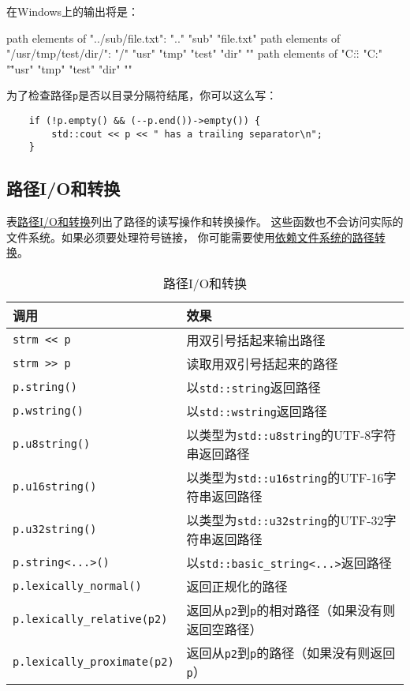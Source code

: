 在Windows上的输出将是：
\begin{blacklisting}
    path elements of "../sub/file.txt":
    ".."  "sub"  "file.txt"
    path elements of "/usr/tmp/test/dir/":
    "/"  "usr"  "tmp"  "test"  "dir"  ""
    path elements of "C:\usr\tmp\test\dir\":
    "C:"  "\"  "usr"  "tmp"  "test"  "dir"  ""
\end{blacklisting}
为了检查路径\texttt{p}是否以目录分隔符结尾，你可以这么写：
\begin{lstlisting}
    if (!p.empty() && (--p.end())->empty()) {
        std::cout << p << " has a trailing separator\n";
    }
\end{lstlisting}

\subsection{路径I/O和转换}\label{ch20.3.3}
表\hyperref[t20.5]{路径I/O和转换}列出了路径的读写操作和转换操作。
这些函数也不会访问实际的文件系统。如果必须要处理符号链接，
你可能需要使用\hyperref[ch20.4.5]{依赖文件系统的路径转换}。
\begin{table}[htb]
    \centering
    \begin{tabular}{l|l}
        \hline
        \textbf{调用}                         & \textbf{效果}                                     \\
        \hline
        \texttt{strm << p}                  & 用双引号括起来输出路径                                     \\
        \texttt{strm >> p}                  & 读取用双引号括起来的路径                                    \\
        \texttt{p.string()}                 & 以\texttt{std::string}返回路径                       \\
        \texttt{p.wstring()}                & 以\texttt{std::wstring}返回路径                      \\
        \texttt{p.u8string()}               & 以类型为\texttt{std::u8string}的UTF-8字符串返回路径         \\
        \texttt{p.u16string()}              & 以类型为\texttt{std::u16string}的UTF-16字符串返回路径       \\
        \texttt{p.u32string()}              & 以类型为\texttt{std::u32string}的UTF-32字符串返回路径       \\
        \texttt{p.string<...>()}            & 以\texttt{std::basic\_string<...>}返回路径           \\
        \texttt{p.lexically\_normal()}      & 返回正规化的路径                                        \\
        \texttt{p.lexically\_relative(p2)}  & 返回从\texttt{p2}到\texttt{p}的相对路径（如果没有则返回空路径）      \\
        \texttt{p.lexically\_proximate(p2)} & 返回从\texttt{p2}到\texttt{p}的路径（如果没有则返回\texttt{p}） \\
        \hline
    \end{tabular}
    \caption{路径I/O和转换}
    \label{t20.5}
\end{table}

